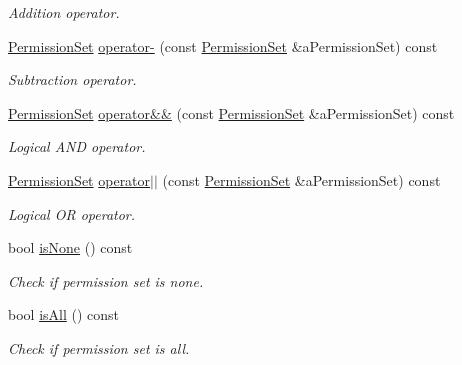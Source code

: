 \begin{DoxyCompactItemize}
\begin{DoxyCompactList}\small\item\em Addition operator. \end{DoxyCompactList}\item 
\hyperlink{classlibrary_1_1core_1_1fs_1_1_permission_set}{Permission\+Set} \hyperlink{classlibrary_1_1core_1_1fs_1_1_permission_set_a57a772018ca9c19db87139672a48a532}{operator-\/} (const \hyperlink{classlibrary_1_1core_1_1fs_1_1_permission_set}{Permission\+Set} \&a\+Permission\+Set) const
\begin{DoxyCompactList}\small\item\em Subtraction operator. \end{DoxyCompactList}\item 
\hyperlink{classlibrary_1_1core_1_1fs_1_1_permission_set}{Permission\+Set} \hyperlink{classlibrary_1_1core_1_1fs_1_1_permission_set_ab5a43fc956ebbe91328a776b1023b199}{operator\&\&} (const \hyperlink{classlibrary_1_1core_1_1fs_1_1_permission_set}{Permission\+Set} \&a\+Permission\+Set) const
\begin{DoxyCompactList}\small\item\em Logical A\+ND operator. \end{DoxyCompactList}\item 
\hyperlink{classlibrary_1_1core_1_1fs_1_1_permission_set}{Permission\+Set} \hyperlink{classlibrary_1_1core_1_1fs_1_1_permission_set_a6e17088c9270586ced726ec2721b587b}{operator$\vert$$\vert$} (const \hyperlink{classlibrary_1_1core_1_1fs_1_1_permission_set}{Permission\+Set} \&a\+Permission\+Set) const
\begin{DoxyCompactList}\small\item\em Logical OR operator. \end{DoxyCompactList}\item 
bool \hyperlink{classlibrary_1_1core_1_1fs_1_1_permission_set_a9c4a4a58d8422c9bfa8873184983f455}{is\+None} () const
\begin{DoxyCompactList}\small\item\em Check if permission set is none. \end{DoxyCompactList}\item 
bool \hyperlink{classlibrary_1_1core_1_1fs_1_1_permission_set_a2e9d3f4da25dc33be1e11f461db4983d}{is\+All} () const
\begin{DoxyCompactList}\small\item\em Check if permission set is all. \end{DoxyCompactList}\item 

\end{DoxyCompactItemize}
